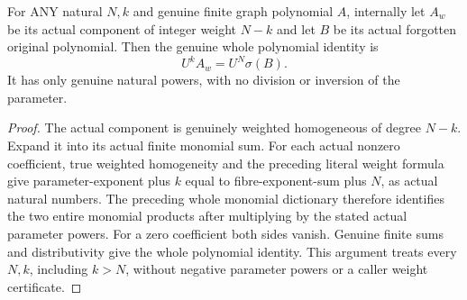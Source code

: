 \begin{lemma}
\label{hir:relative-normal-graph-weight-natural-parameter-reconstruction}
\leanok
For ANY natural $N,k$ and genuine finite graph polynomial $A$, internally let $A_w$ be its actual component of integer weight $N-k$ and let $B$ be its actual forgotten original polynomial. Then the genuine whole polynomial identity is
\[U^k A_w=U^N\sigma(B).\]
It has only genuine natural powers, with no division or inversion of the parameter.
\end{lemma}
\begin{proof}
The actual component is genuinely weighted homogeneous of degree $N-k$. Expand it into its actual finite monomial sum. For each actual nonzero coefficient, true weighted homogeneity and the preceding literal weight formula give parameter-exponent plus $k$ equal to fibre-exponent-sum plus $N$, as actual natural numbers. The preceding whole monomial dictionary therefore identifies the two entire monomial products after multiplying by the stated actual parameter powers. For a zero coefficient both sides vanish. Genuine finite sums and distributivity give the whole polynomial identity. This argument treats every $N,k$, including $k>N$, without negative parameter powers or a caller weight certificate.
\end{proof}

